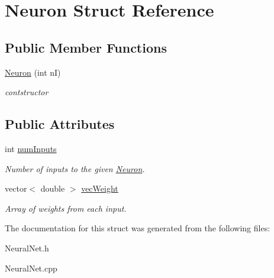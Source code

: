 \hypertarget{struct_neuron}{}\section{Neuron Struct Reference}
\label{struct_neuron}
\subsection*{Public Member Functions}
\begin{DoxyCompactItemize}
\item 
\hypertarget{struct_neuron_ad748d6c737ad37c00bb6d9a75ede221d}{}\label{struct_neuron_ad748d6c737ad37c00bb6d9a75ede221d} 
\hyperlink{struct_neuron_ad748d6c737ad37c00bb6d9a75ede221d}{Neuron} (int nI)
\begin{DoxyCompactList}\small\item\em contstructor \end{DoxyCompactList}\end{DoxyCompactItemize}
\subsection*{Public Attributes}
\begin{DoxyCompactItemize}
\item 
\hypertarget{struct_neuron_a09992eeceb974593f5bf557aae581d2d}{}\label{struct_neuron_a09992eeceb974593f5bf557aae581d2d} 
int \hyperlink{struct_neuron_a09992eeceb974593f5bf557aae581d2d}{num\+Inputs}
\begin{DoxyCompactList}\small\item\em Number of inputs to the given \hyperlink{struct_neuron}{Neuron}. \end{DoxyCompactList}\item 
\hypertarget{struct_neuron_abc0dcf719541568ee5fa4201d1e3d4b4}{}\label{struct_neuron_abc0dcf719541568ee5fa4201d1e3d4b4} 
vector$<$ double $>$ \hyperlink{struct_neuron_abc0dcf719541568ee5fa4201d1e3d4b4}{vec\+Weight}
\begin{DoxyCompactList}\small\item\em Array of weights from each input. \end{DoxyCompactList}\end{DoxyCompactItemize}


The documentation for this struct was generated from the following files\+:\begin{DoxyCompactItemize}
\item 
Neural\+Net.\+h\item 
Neural\+Net.\+cpp\end{DoxyCompactItemize}
